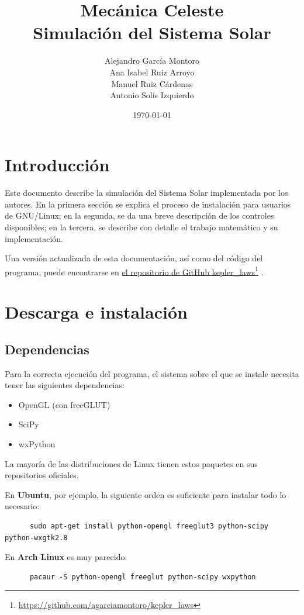 \documentclass[a4paper, 11pt]{article}
\title{Mecánica Celeste \\ Simulación del Sistema Solar}
\author{Alejandro García Montoro\\
        Ana Isabel Ruiz Arroyo\\
        Manuel Ruiz Cárdenas\\
        Antonio Solís Izquierdo}
\date{\today}
\newcommand\fnurl[2]{%
  \href{#2}{#1}\footnote{\url{#2}}%
}
\begin{document}
  \maketitle

  \section{Introducción}
  Este documento describe la simulación del Sistema Solar implementada por los autores. En la primera sección se explica el proceso de instalación para usuarios de GNU/Linux; en la segunda, se da una breve descripción de los controles disponibles; en la tercera, se describe con detalle el trabajo matemático y su implementación.

  Una versión actualizada de esta documentación, así como del código del programa, puede encontrarse en \fnurl{el repositorio de GitHub kepler\_laws}{https://github.com/agarciamontoro/kepler_laws}.

  \section{Descarga e instalación}
  \subsection{Dependencias}
  Para la correcta ejecución del programa, el sistema sobre el que se instale necesita tener las siguientes dependencias:

  \begin{itemize}
      \item OpenGL (con freeGLUT)
      \item SciPy
      \item wxPython
  \end{itemize}

  La mayoría de las distribuciones de Linux tienen estos paquetes en sus repositorios oficiales.

  En \textbf{Ubuntu}, por ejemplo, la siguiente orden es suficiente para instalar todo lo necesario:

  \begin{lstlisting}
      sudo apt-get install python-opengl freeglut3 python-scipy python-wxgtk2.8
  \end{lstlisting}

  En \textbf{Arch Linux} es muy parecido:

  \begin{lstlisting}
      pacaur -S python-opengl freeglut python-scipy wxpython
  \end{lstlisting}
\end{document}
